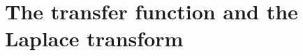 \documentclass[11pt,a4paper]{book}
\theoremstyle{plain}
\numberwithin{equation}{section}
\renewcommand{\Re}{\operatorname{Re}}
\begin{document}
 





\section{The transfer function and the Laplace transform}\label{sec:transf-funct-lapl}
\end{document}
